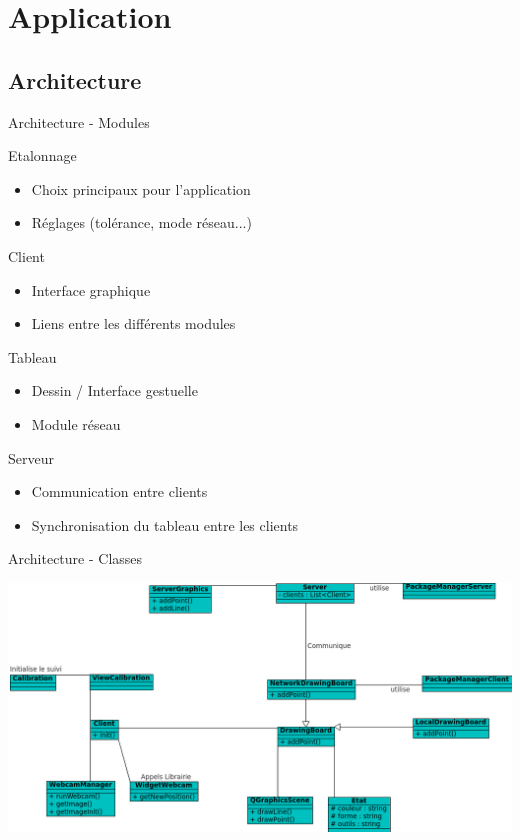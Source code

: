 \documentclass{beamer}
\begin{document}
		\section{Application}
		\subsection{Architecture}
		\begin{frame}{Architecture - Modules}
			\pause
			\begin{block}{Etalonnage}
				\begin{itemize}
					\item Choix principaux pour l'application
					\item Réglages (tolérance, mode réseau...)
				\end{itemize}
			\end{block}
			\pause
			\begin{block}{Client}
				\begin{itemize}
					\item Interface graphique
					\item Liens entre les différents modules
				\end{itemize}
			\end{block}
			\pause
			\begin{block}{Tableau}
				\begin{itemize}
					\item Dessin / Interface gestuelle
					\item Module réseau
				\end{itemize}
			\end{block}
			\pause
			\begin{block}{Serveur}
				\begin{itemize}
					\item Communication entre clients
					\item Synchronisation du tableau entre les clients
				\end{itemize}
			\end{block}
		\end{frame}
	
		\begin{frame}{Architecture - Classes}
			\begin{center}		
				\includegraphics[scale=0.45]{../uml/classes.png}
			\end{center}
		\end{frame}
		
\end{document}
